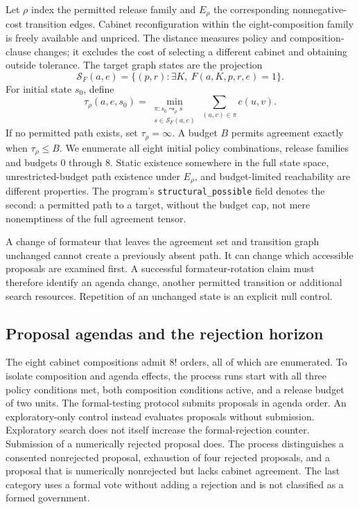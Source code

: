 \documentclass[11pt,a4paper]{article}
\newcommand{\States}{\mathcal{S}}
\begin{document}
Let \(\rho\) index the permitted release family and \(E_\rho\) the corresponding nonnegative-cost transition edges. Cabinet reconfiguration within the eight-composition family is freely available and unpriced. The distance measures policy and composition-clause changes; it excludes the cost of selecting a different cabinet and obtaining outside tolerance. The target graph states are the projection
\[
\States_F(a,e)=\{(p,r):\exists K,\ F(a,K,p,r,e)=1\}.
\]
For initial state \(s_0\), define
\[
\tau_\rho(a,e,s_0)=
\min_{\substack{\pi:s_0\leadsto_\rho s\\s\in\States_F(a,e)}}
\sum_{(u,v)\in\pi}c(u,v).
\]
If no permitted path exists, set \(\tau_\rho=\infty\). A budget \(B\) permits agreement exactly when \(\tau_\rho\le B\). We enumerate all eight initial policy combinations, release families and budgets 0 through 8. Static existence somewhere in the full state space, unrestricted-budget path existence under \(E_\rho\), and budget-limited reachability are different properties. The program's \texttt{structural\_possible} field denotes the second: a permitted path to a target, without the budget cap, not mere nonemptiness of the full agreement tensor.

A change of formateur that leaves the agreement set and transition graph unchanged cannot create a previously absent path. It can change which accessible proposals are examined first. A successful formateur-rotation claim must therefore identify an agenda change, another permitted transition or additional search resources. Repetition of an unchanged state is an explicit null control.

\subsection{Proposal agendas and the rejection horizon}

The eight cabinet compositions admit \(8!\) orders, all of which are enumerated. To isolate composition and agenda effects, the process runs start with all three policy conditions met, both composition conditions active, and a release budget of two units. The formal-testing protocol submits proposals in agenda order. An exploratory-only control instead evaluates proposals without submission. Exploratory search does not itself increase the formal-rejection counter. Submission of a numerically rejected proposal does. The process distinguishes a consented nonrejected proposal, exhaustion of four rejected proposals, and a proposal that is numerically nonrejected but lacks cabinet agreement. The last category uses a formal vote without adding a rejection and is not classified as a formed government.
\end{document}
